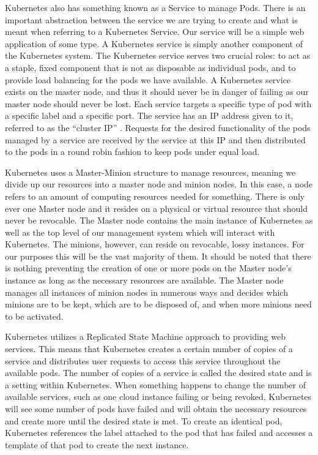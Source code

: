\documentclass[thesis,proposal]{umassthesis}  %
\begin{document}
Kubernetes also has something known as a Service to manage Pods. There is an important abstraction between the service we are trying to create and what is meant when referring to a Kubernetes Service. Our service will be a simple web application of some type. A Kubernetes service is simply another component of the Kubernetes system. The Kubernetes service serves two crucial roles: to act as a staple, fixed component that is not as disposable as individual pods, and to provide load balancing for the pods we have available. A Kubernetes service exists on the master node, and thus it should never be in danger of failing as our master node should never be lost. Each service targets a specific type of pod with a specific label and a specific port. The service has an IP address given to it, referred to as the “cluster IP” \cite{googleGuideServices}. Requests for the desired functionality of the pods managed by a service are received by the service at this IP and then distributed to the pods in a round robin fashion to keep pods under equal load.\par

	Kubernetes uses a Master-Minion structure to manage resources, meaning we divide up our resources into a master node and minion nodes. In this case, a node refers to an amount of computing resources needed for something. There is only ever one Master node and it resides on a physical or virtual resource that should never be revocable. The Master node contains the main instance of Kubernetes as well as the top level of our management system which will interact with Kubernetes. The minions, however, can reside on revocable, lossy instances. For our purposes this will be the vast majority of them. It should be noted that there is nothing preventing the creation of one or more pods on the Master node’s instance as long as the necessary resources are available. The Master node manages all instances of minion nodes in numerous ways and decides which minions are to be kept, which are to be disposed of, and when more minions need to be activated.\par
    
Kubernetes utilizes a Replicated State Machine approach to providing web services. This means that Kubernetes creates a certain number of copies of a service and distributes user requests to access this service throughout the available pods. The number of copies of a service is called the desired state and is a setting within Kubernetes. When something happens to change the number of available services, such as one cloud instance failing or being revoked, Kubernetes will see some number of pods have failed and will obtain the necessary resources and create more until the desired state is met. To create an identical pod, Kubernetes references the label attached to the pod that has failed and accesses a template of that pod to create the next instance.\par
\end{document}
